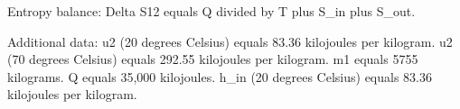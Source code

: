Entropy balance:  
Delta S12 equals Q divided by T plus S_in plus S_out.  

Additional data:  
u2 (20 degrees Celsius) equals 83.36 kilojoules per kilogram.  
u2 (70 degrees Celsius) equals 292.55 kilojoules per kilogram.  
m1 equals 5755 kilograms.  
Q equals 35,000 kilojoules.  
h_in (20 degrees Celsius) equals 83.36 kilojoules per kilogram.